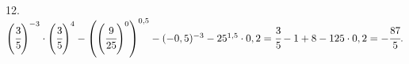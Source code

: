 12. $\left(\cfrac{3}{5}\right)^{-3}\cdot\left(\cfrac{3}{5}\right)^{4}-\left(\left(\cfrac{9}{25}\right)^{0}\right)^{0,5}-(-0,5)^{-3}-25^{1,5}\cdot0,2=
\cfrac{3}{5}-1+8-125\cdot0,2=-\cfrac{87}{5}.$\\
